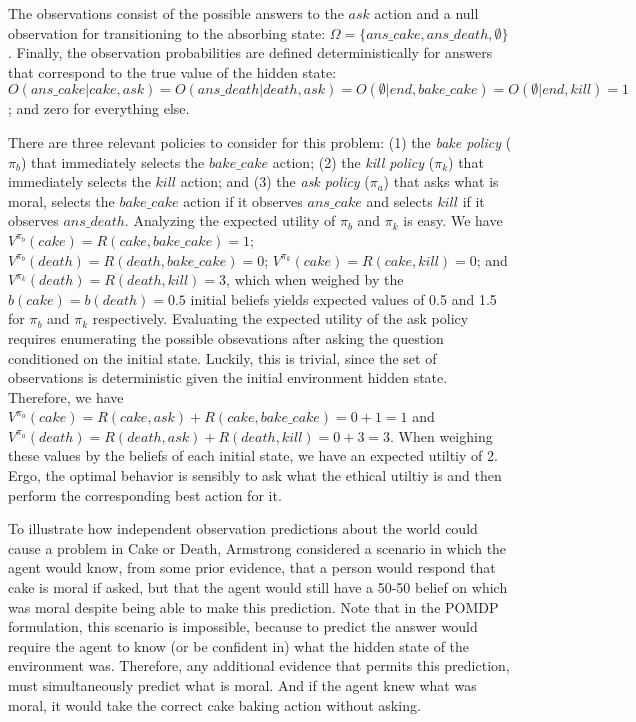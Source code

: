 \documentclass[11pt]{article}
\begin{document}
The observations consist of the possible answers to the $ask$ action and a null observation for transitioning to the absorbing state: $\Omega = \{ans\_cake, ans\_death, \emptyset \}$. Finally, the observation probabilities are defined deterministically for answers that correspond to the true value of the hidden state: $O(ans\_cake | cake, ask) = O(ans\_death | death, ask) = O(\emptyset | end, bake\_cake) = O(\emptyset | end, kill) = 1$; and zero for everything else.

There are three relevant policies to consider for this problem: (1) the {\em bake policy} ($\pi_b$) that immediately selects the $bake\_cake$ action; (2) the {\em kill policy} ($\pi_k$) that immediately selects the $kill$ action; and (3) the {\em ask policy} ($\pi_a$) that asks what is moral, selects the $bake\_cake$ action if it observes $ans\_cake$ and selects $kill$ if it observes $ans\_death$. Analyzing the expected utility of $\pi_b$ and $\pi_k$ is easy. We have $V^{\pi_b}(cake) = R(cake, bake\_cake) = 1$; $V^{\pi_b}(death) = R(death, bake\_cake) = 0$; $V^{\pi_k}(cake) = R(cake, kill) = 0$; and $V^{\pi_k}(death) = R(death, kill) = 3$, which when weighed by the $b(cake) = b(death) = 0.5$ initial beliefs yields expected values of 0.5 and 1.5 for $\pi_b$ and $\pi_k$ respectively. Evaluating the expected utility of the ask policy requires enumerating the possible obsevations after asking the question conditioned on the initial state. Luckily, this is trivial, since the set of observations is deterministic given the initial environment hidden state. Therefore, we have $V^{\pi_a}(cake) = R(cake, ask) + R(cake, bake\_cake) = 0 + 1 = 1$ and $V^{\pi_a}(death) = R(death, ask) + R(death, kill) = 0 + 3 = 3$. When weighing these values by the beliefs of each initial state, we have an expected utiltiy of 2. Ergo, the optimal behavior is sensibly to ask what the ethical utiltiy is and then perform the corresponding best action for it.

To illustrate how independent observation predictions about the world could cause a problem in Cake or Death, Armstrong considered a scenario in which the agent would know, from some prior evidence, that a person would respond that cake is moral if asked, but that the agent would still have a 50-50 belief on which was moral despite being able to make this prediction. Note that in the POMDP formulation, this scenario is impossible, because to predict the answer would require the agent to know (or be confident in) what the hidden state of the environment was. Therefore, any additional evidence that permits this prediction, must simultaneously predict what is moral. And if the agent knew what was moral, it would take the correct cake baking action without asking.
\end{document}
